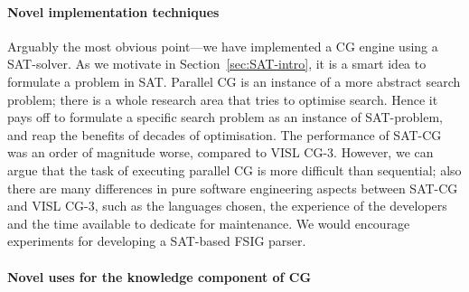 









\paragraph{Novel implementation techniques} Arguably the most obvious point---we have implemented a CG engine using a SAT-solver. 
As we motivate in Section~\ref{sec:SAT-intro}, it is a smart idea to formulate a problem in SAT. 
Parallel CG is an instance of a more abstract search problem; there is a whole research area that tries to optimise search. Hence it pays off to formulate a specific search problem as an instance of SAT-problem, and reap the benefits of decades of optimisation. 
The performance of SAT-CG was an order of magnitude worse, compared to VISL CG-3. However, we can argue that the task of executing parallel CG is more difficult than sequential; also there are many differences in pure software engineering aspects between SAT-CG and VISL CG-3, such as the languages chosen, the experience of the developers and the time available to dedicate for maintenance. We would encourage experiments for developing a SAT-based FSIG parser.

\paragraph{Novel uses for the knowledge component of CG} 

